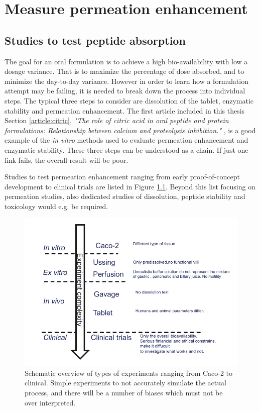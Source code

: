 \chapter{Measure permeation enhancement}

\section{Studies to test peptide absorption}
The goal for an oral formulation is to achieve a high bio-availability with low a dosage variance. That is to maximize the percentage of dose absorbed, and to minimize the day-to-day variance. However in order to learn how a formulation attempt may be failing, it is needed to break down the process into individual steps. The typical three steps to consider are dissolution of the tablet, enzymatic stability and permeation enhancement. The first article included in this thesis Section \ref{article:citric}, \textit{"The role of citric acid in oral peptide and protein formulations: Relationship between calcium and proteolysis inhibition."} \cite{welling2014citric}, is a good example of the \textit{in vitro} methods used to evaluate permeation enhancement and enzymatic stability. These three steps can be understood as a chain. If just one link fails, the overall result will be poor.

Studies to test permeation enhancement ranging from early proof-of-concept development to clinical trials are listed in Figure \ref{devel_typeOf}. Beyond this list focusing on permeation studies, also dedicated studies of dissolution, peptide stability and toxicology would e.g. be required.

\begin{figure}[!htbp]
\includegraphics{graphics/typeOfExperiments.pdf}
\caption{Schematic overview of types of experiments ranging from Caco-2 to clinical. Simple experiments to not accurately simulate the actual process, and there will be a number of biases which must not be over interpreted.}
\label{devel_typeOf}
\end{figure}

